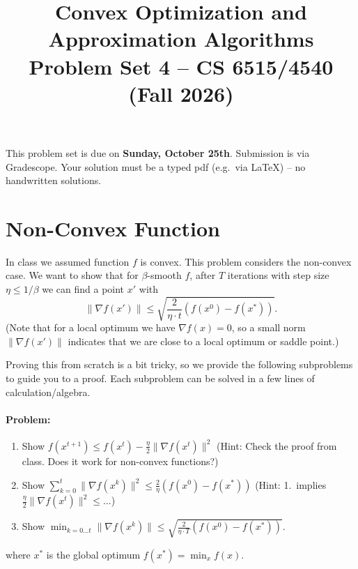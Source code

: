 \documentclass[10pt,letterpaper]{article}
\title{Convex Optimization and Approximation Algorithms\\Problem Set 4 -- CS 6515/4540 (Fall 2026)}
\date{}
\newcommand{\jan}[1]{\textcolor{red}{Jan: #1}}
\begin{document}
\maketitle
\vspace{-50pt}
\noindent
This problem set is due on \textbf{Sunday, October 25th}. Submission is via Gradescope. Your solution must be a typed pdf (e.g.~via LaTeX) -- no handwritten solutions.




\setcounter{section}{15}

 


 


\section{Non-Convex Function}

In class we assumed function $f$ is convex. This problem considers the non-convex case.
We want to show that for $\beta$-smooth $f$, after $T$ iterations with step size $\eta \le 1/\beta$ we can find a point $x'$ with
$$
\|\nabla f(x')\| \le \sqrt{\frac{2}{\eta \cdot t} (f(x^0) - f(x^*))}.
$$
(Note that for a local optimum we have $\nabla f(x) = 0$, so a small norm $\|\nabla f(x')\|$ indicates that we are close to a local optimum or saddle point.)

Proving this from scratch is a bit tricky, so we provide the following subproblems to guide you to a proof. Each subproblem can be solved in a few lines of calculation/algebra.
\paragraph{Problem:}
\begin{enumerate}
    \item Show
    $f(x^{t+1}) \le f(x^t) - \frac{\eta}{2} \|\nabla f(x^t)\|^2$ (Hint: Check the proof from class. Does it work for non-convex functions?)
    \item Show
    $
    \sum_{k=0}^t \|\nabla f(x^k)\|^2 \le \frac{2}{\eta} (f(x^0) - f(x^*))
    $ (Hint: 1.~implies $\frac{\eta}{2} \|\nabla f(x^t)\|^2 \le ...$)
    \item Show
    $
\min_{k=0...t}\|\nabla f(x^k)\| \le \sqrt{\frac{2}{\eta \cdot T} (f(x^0) - f(x^*))}.
$
\end{enumerate}
where $x^*$ is the global optimum $f(x^*) = \min_x f(x)$.
\end{document}
